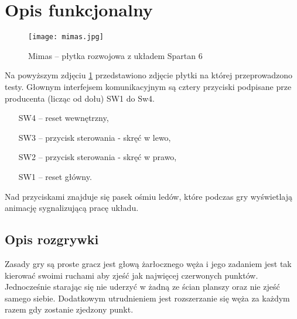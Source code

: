 \section{Opis funkcjonalny}
    \begin{figure}[!ht]
        \centering
        \texttt{[image: mimas.jpg]}
        \renewcommand{\figurename}{Zdjęcie}
        \caption{Mimas -- płytka rozwojowa z układem Spartan 6}
        \label{fig:mimas}
    \end{figure}
    Na powyższym zdjęciu \ref{fig:mimas} przedstawiono zdjęcie płytki na której przeprowadzono testy.
    Głownym interfejsem komunikacyjnym są cztery przyciski podpisane prze producenta (licząc od dołu) SW1 do Sw4.
    \begin{enumerate}
        \item [SW4 -- ] reset wewnętrzny,
        \item [SW3 -- ] przycisk sterowania - skręć w lewo,
        \item [SW2 -- ] przycisk sterowania - skręć w prawo,
        \item [SW1 -- ] reset główny.
    \end{enumerate}
% 
    Nad przyciskami znajduje się pasek ośmiu ledów, które podczas gry wyświetlają animację sygnalizującą
    pracę układu.

    \subsection{Opis rozgrywki}
        \tab Zasady gry są proste gracz jest głową żarłocznego węża 
        i jego zadaniem jest tak kierować swoimi ruchami aby zjeść jak najwięcej czerwonych punktów.
        Jednocześnie starając się nie uderzyć w żadną ze ścian planszy oraz nie zjeść samego siebie.
        Dodatkowym utrudnieniem jest rozszerzanie się węża za każdym razem gdy zostanie zjedzony punkt.

